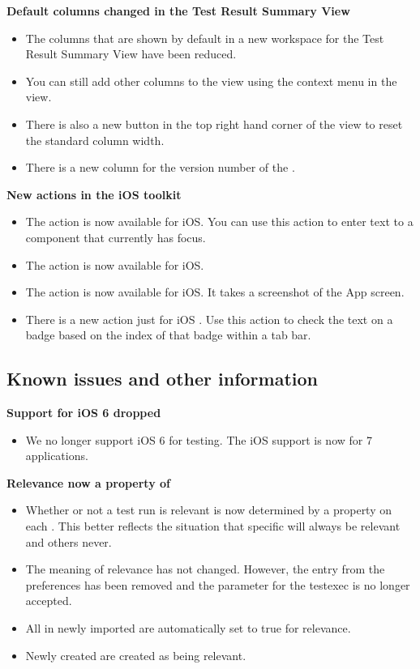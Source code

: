 \textbf{Default columns changed in the Test Result Summary View}
\begin{itemize}
\item The columns that are shown by default in a new workspace for the Test Result Summary View have been reduced.
\item You can still add other columns to the view using the context menu in the view.
\item There is also a new button in the top right hand corner of the view to reset the standard column width.
\item There is a new column for the version number of the \gdproject{}.
\end{itemize}

\textbf{New actions in the iOS toolkit}
\begin{itemize}
\item The action  is now available for iOS. You can use this action to enter text to a component that currently has focus.
\item The action  is now available for iOS.
\item The action  is now available for iOS. It takes a screenshot of the App screen.
\item There is a new action just for iOS . Use this action to check the text on a badge based on the index of that badge within a tab bar. 
\end{itemize}



\subsection{Known issues and other information}
\textbf{Support for iOS 6 dropped}
\begin{itemize}
\item We no longer support iOS 6 for testing. The iOS support is now for 7 applications. 
\end{itemize}

\textbf{Relevance now a property of \gdsuites{}}
\begin{itemize}
\item Whether or not a test run is relevant is now determined by a property on each \gdsuite{}. This better reflects the situation that specific \gdsuites{} will always be relevant and others never. 
\item The meaning of relevance has not changed. However, the entry from the preferences has been removed and the parameter for the testexec is no longer accepted. 
\item All \gdsuites{} in newly imported \gdprojects{} are automatically set to true for relevance.
\item Newly created \gdsuites{} are created as being relevant.
\end{itemize}
